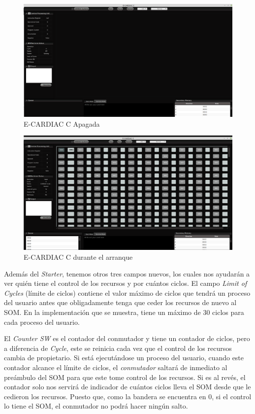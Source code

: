\documentclass[letterpaper,12pt,oneside]{book}
\begin{document}
		\begin{figure}[h]		
			\centering
			\includegraphics[scale=0.25]{media/CARDIACC/ECARDIACC_apagada.png}
			\caption{E-CARDIAC C Apagada}
			\label{fig:eccApagada}
		\end{figure}		
		
		\begin{figure}[h]		
			\centering
			\includegraphics[scale=0.25]{media/CARDIACC/ECARDIACC_encendida1.png}
			\caption{E-CARDIAC C durante el arranque}
			\label{fig:eccEncendida1}
		\end{figure}
	
		Además del \textit{Starter}, tenemos otros tres campos nuevos, los cuales nos ayudarán a ver quién tiene el control de los recursos y por 
		cuántos ciclos. El campo
		\textit{Limit of Cycles} (límite de ciclos) contiene el valor máximo de ciclos que tendrá un proceso del usuario antes que obligadamente tenga 
		que ceder
		los recursos de nuevo al SOM. En la implementación que se muestra, tiene un máximo de 30 ciclos para cada proceso del usuario.
  
        El \textit{Counter SW} es el contador del conmutador y tiene
		un contador de ciclos, pero a diferencia de \textit{Cycle}, este se reinicia cada vez que el control de los recursos cambia de propietario. Si 
		está
		ejecutándose un proceso del usuario, cuando este contador alcance el límite de ciclos, el \textit{conmutador} saltará
		de inmediato al preámbulo del SOM para que este tome control de los recursos. Si es al revés, el contador solo nos servirá de indicador
		de cuántos ciclos lleva el SOM desde que le cedieron los recursos. Puesto que, como la bandera se encuentra en 0, si el control lo tiene el SOM, 
		el conmutador no podrá hacer ningún salto.
  
\end{document}

